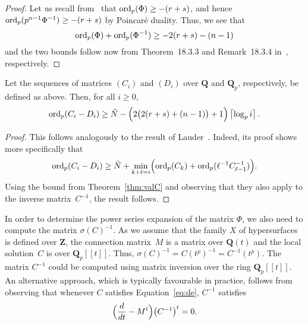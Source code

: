 \begin{proof}
Let us recall from~\citep[Lemma~3.3]{Gerkmann2007} that 
$\operatorname{ord}_p(\Phi) \geq -(r+s)$, and hence $\operatorname{ord}_p(p^{n-1}\Phi^{-1}) \geq -(r+s)$ 
by Poincar\'e duality.  Thus, we see that 
\begin{equation}
\operatorname{ord}_p(\Phi) + \operatorname{ord}_p(\Phi^{-1}) \geq - 2 (r+s) - (n-1)
\end{equation}
and the two bounds follow now from Theorem~{18.3.3} and Remark~{18.3.4} 
in~\citep{Kedlaya2010}, respectively.
\end{proof}

\begin{thm}
Let the sequences of matrices $(C_i)$ and $(D_i)$ over $\mathbf{Q}$ and 
$\mathbf{Q}_p$, respectively, be defined as above.  Then, for all $i \geq 0$, 
\begin{equation}
\operatorname{ord}_p(C_i - D_i) \geq 
    \tilde{N} - \Bigl(2 \bigl(2 (r+s) + (n-1)\bigr) + 1\Bigr) \left\lceil\log_p i\right\rceil.
\end{equation}
\end{thm}

\begin{proof}
This follows analogously to the result of 
Lauder~\citep[Theorem~5.1]{Lauder2006}.  
Indeed, its proof shows more specifically that 
\begin{equation}
\operatorname{ord}_p(C_i - D_i) \geq 
    \tilde{N} + \min_{k+\ell=i} \Bigl(\operatorname{ord}_p(C_k) + 
                                      \operatorname{ord}_p(\ell^{-1} C_{\ell-1}^{-1})\Bigr).
\end{equation}
Using the bound from Theorem~\ref{thm:valC} and observing that 
they also apply to the inverse matrix~$C^{-1}$, the result follows.
\end{proof}

In order to determine the power series expansion of the matrix $\Phi$, 
we also need to compute the matrix $\sigma(C)^{-1}$.  As we assume that 
the family $X$ of hypersurfaces is defined over $\mathbf{Z}$, the connection 
matrix~$M$ is a matrix over $\mathbf{Q}(t)$ and the local solution~$C$ is 
over $\mathbf{Q}_p[[t]]$.  Thus, $\sigma(C)^{-1} = C(t^p)^{-1} = C^{-1}(t^p)$. 
The matrix $C^{-1}$ could be computed using matrix inversion over the ring 
$\mathbf{Q}_p[[t]]$.  An alternative approach, which is typically favourable 
in practice, follows from observing that whenever $C$ satisfies 
Equation~\eqref{eq:de}, $C^{-1}$ satisfies 
\begin{equation}
\Bigl(\frac{d}{dt} - M^t\Bigr) \bigl(C^{-1}\bigr)^t = 0.
\end{equation}

